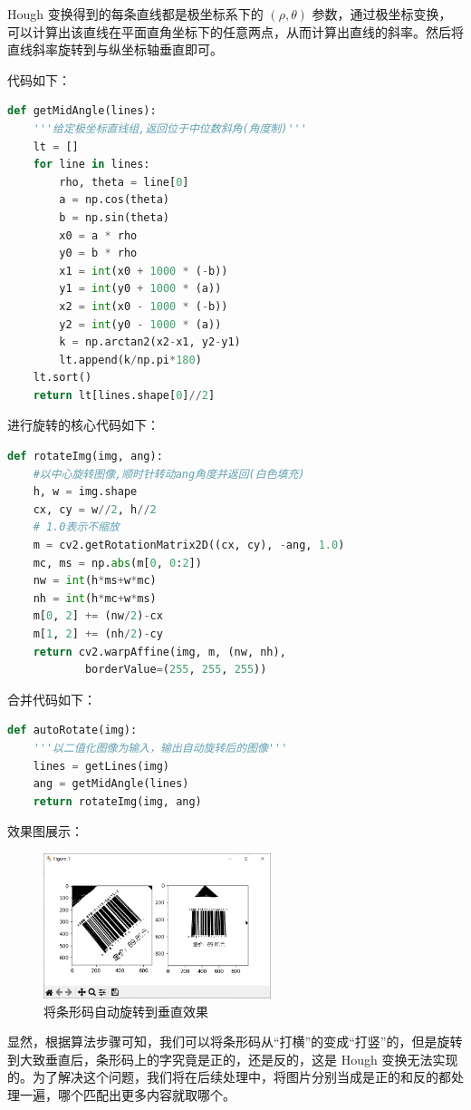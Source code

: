 \documentclass{ctexart}
\begin{document}
Hough 变换得到的每条直线都是极坐标系下的 $(\rho,\theta)$ 参数，通过极坐标变换，可以计算出该直线在平面直角坐标下的任意两点，从而计算出直线的斜率。然后将直线斜率旋转到与纵坐标轴垂直即可。

代码如下：
\begin{lstlisting}[language=python]
def getMidAngle(lines):
    '''给定极坐标直线组,返回位于中位数斜角(角度制)'''
    lt = []
    for line in lines:
        rho, theta = line[0]
        a = np.cos(theta)
        b = np.sin(theta)
        x0 = a * rho
        y0 = b * rho
        x1 = int(x0 + 1000 * (-b))
        y1 = int(y0 + 1000 * (a))
        x2 = int(x0 - 1000 * (-b))
        y2 = int(y0 - 1000 * (a))
        k = np.arctan2(x2-x1, y2-y1)
        lt.append(k/np.pi*180)
    lt.sort()
    return lt[lines.shape[0]//2]
\end{lstlisting}

进行旋转的核心代码如下：
\begin{lstlisting}[language=python]
def rotateImg(img, ang):
    #以中心旋转图像,顺时针转动ang角度并返回(白色填充)
    h, w = img.shape
    cx, cy = w//2, h//2
    # 1.0表示不缩放
    m = cv2.getRotationMatrix2D((cx, cy), -ang, 1.0)
    mc, ms = np.abs(m[0, 0:2])
    nw = int(h*ms+w*mc)
    nh = int(h*mc+w*ms)
    m[0, 2] += (nw/2)-cx
    m[1, 2] += (nh/2)-cy
    return cv2.warpAffine(img, m, (nw, nh),
            borderValue=(255, 255, 255))
\end{lstlisting}

合并代码如下：
\begin{lstlisting}[language=python]
def autoRotate(img):
    '''以二值化图像为输入，输出自动旋转后的图像'''
    lines = getLines(img)
    ang = getMidAngle(lines)
    return rotateImg(img, ang)
\end{lstlisting}

效果图展示：
\begin{figure}[H]
    \centering
    \includegraphics[height=120pt]{sample_autoRotate}
    \caption{将条形码自动旋转到垂直效果}
\end{figure}

显然，根据算法步骤可知，我们可以将条形码从“打横”的变成“打竖”的，但是旋转到大致垂直后，条形码上的字究竟是正的，还是反的，这是 Hough 变换无法实现的。为了解决这个问题，我们将在后续处理中，将图片分别当成是正的和反的都处理一遍，哪个匹配出更多内容就取哪个。
\end{document}
